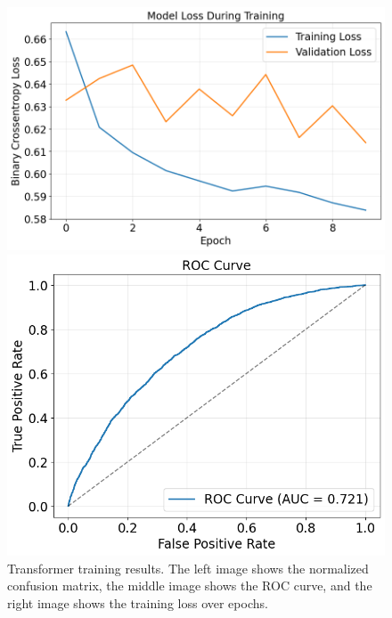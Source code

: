 \documentclass{pracalicmgr}
\begin{document}
\begin{figure}[H]
    \begin{minipage}[t]{0.48\textwidth}
        \centering
        \includegraphics[width=\textwidth]{src/transformerLoss.png}
    \end{minipage}
    \hfill
    \begin{minipage}[t]{0.48\textwidth}
        \centering
        \includegraphics[width=\textwidth]{src/transformerROCurve.png}
    \end{minipage}
    \caption{Transformer training results. The left image shows the normalized confusion matrix, the middle image shows the ROC curve, and the right image shows the training loss over epochs.}
    \label{fig:tranformerResults}
\end{figure}
\end{document}
